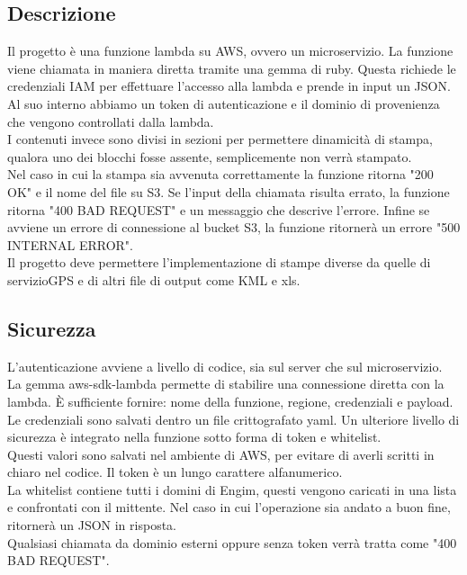 \documentclass[12pt]{article}
\begin{document}
\subsection{Descrizione}
Il progetto è una funzione lambda su AWS, ovvero un microservizio. La funzione 
viene chiamata in maniera diretta tramite una gemma di ruby.
Questa richiede le credenziali IAM per effettuare l'accesso alla lambda e prende 
in input un JSON. Al suo interno abbiamo un token di autenticazione e il dominio 
di provenienza che vengono controllati dalla lambda. 
\\ I contenuti invece sono divisi in sezioni per permettere dinamicità di stampa, 
qualora uno dei blocchi fosse assente, semplicemente non verrà stampato. 
\\ Nel caso in cui la stampa sia avvenuta correttamente la funzione ritorna 
"200 OK"
e il nome del file su S3. Se l'input della chiamata risulta errato, la funzione ritorna 
"400 BAD REQUEST"
e un messaggio che descrive l'errore. Infine se avviene un errore di connessione 
al bucket S3, la funzione ritornerà un errore "500 INTERNAL ERROR".    
\\ Il progetto deve permettere l'implementazione di stampe diverse da quelle di servizioGPS
e di altri file di output come KML e xls. 



\subsection{Sicurezza}
L'autenticazione avviene a livello di codice, sia sul server che sul microservizio.
\\ La gemma aws-sdk-lambda permette di stabilire una connessione diretta con la 
lambda. È sufficiente fornire: nome della funzione, regione, credenziali e payload. 
Le credenziali sono salvati dentro un file crittografato yaml. 
Un ulteriore livello di sicurezza è integrato nella funzione sotto forma 
di token e whitelist. 
\\ Questi valori sono salvati nel ambiente di AWS, per evitare di averli 
scritti in chiaro nel codice. Il token è un lungo carattere alfanumerico.
\\ La whitelist contiene tutti i domini di Engim, questi vengono caricati in 
una lista e confrontati con il mittente. 
Nel caso in cui 
l'operazione sia andato a buon fine, ritornerà un JSON in risposta.
\\ Qualsiasi chiamata da dominio esterni oppure senza token verrà tratta come 
"400 BAD REQUEST". 
\end{document}
